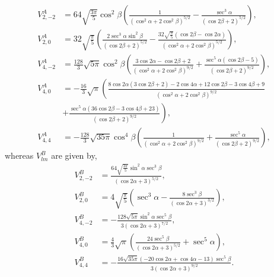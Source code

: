\documentclass[a4paper,prb]{revtex4-1}  %
\newcommand{\az}[1]{{\color{magenta}{#1}}} %
\begin{document}
\begin{align}
V^A_{2,-2}&= 64 \sqrt{\frac{3 \pi }{5}} \cos ^2\beta  \left(\frac{1}{\left(\cos ^2\alpha +2 \cos ^2\beta \right)^{5/2}}-\frac{\sec ^3\alpha }{(\cos 2 \beta +2)^{5/2}}\right),\\
V^A_{2,0}&= 32 \sqrt{\frac{\pi }{5}} \left(\frac{2 \sec ^3\alpha  \sin ^2\beta }{(\cos 2 \beta +2)^{5/2}}-\frac{32 \sqrt{\frac{\pi }{5}} (\cos 2 \beta -\cos 2 \alpha )}{\left(\cos ^2\alpha +2 \cos ^2\beta \right)^{5/2}}\right),\\
V^A_{4,-2}&= \frac{128}{3} \sqrt{5 \pi } \cos ^2\beta  \left(\frac{3 \cos 2 \alpha -\cos 2 \beta +2}{\left(\cos ^2\alpha +2 \cos ^2\beta \right)^{9/2}}+\frac{\sec ^5\alpha  (\cos 2 \beta -5)}{(\cos 2 \beta +2)^{9/2}}\right),\\ \nonumber
V^A_{4,0}&= -\frac{16}{3} \sqrt{\pi } \left(\frac{8 \cos 2 \alpha  (3 \cos 2 \beta +2)-2 \cos 4 \alpha+12 \cos 2 \beta -3 \cos 4 \beta +9}{\left(\cos ^2\alpha +2 \cos ^2\beta \right)^{9/2}}\right. \\
&+\left. \frac{\sec ^5\alpha  (36 \cos 2 \beta -3 \cos 4 \beta +23)}{(\cos 2 \beta +2)^{9/2}}\right),\\
V^A_{4,4}&=-\frac{128}{3} \sqrt{35 \pi } \cos ^4\beta  \left(\frac{1}{\left(\cos ^2\alpha +2 \cos ^2\beta \right)^{9/2}}+\frac{\sec ^5\alpha }{(\cos 2 \beta +2)^{9/2}}\right),
\end{align}
whereas $V_{lm}^{B}$ are given by,
\begin{align}
V^{B}_{2,-2}&=  \frac{64 \sqrt{\frac{3 \pi }{5}} \sin ^2\alpha  \sec ^3\beta }{(\cos 2 \alpha +3)^{5/2}},
 \\ V^{B}_{2,0}&=  4 \sqrt{\frac{\pi }{5}} \left(\sec ^3\alpha -\frac{8 \sec ^3\beta }{(\cos 2 \alpha +3)^{3/2}}\right),\\
 V^{B}_{4,-2}&=  -\frac{128 \sqrt{5 \pi } \sin ^2\alpha  \sec ^5\beta }{3 (\cos 2 \alpha +3)^{7/2}},\\ 
V^{B}_{4,0}&= \frac{4}{3} \sqrt{\pi } \left(\frac{24 \sec ^5\beta }{(\cos 2 \alpha +3)^{5/2}}+\sec ^5\alpha \right),\\
 V^{B}_{4,4}&=  -\frac{16 \sqrt{35 \pi } (-20 \cos 2 \alpha +\cos 4 \alpha -13) \sec ^5\beta }{3 (\cos 2 \alpha +3)^{9/2}}.
 \end{align}
\end{document}
